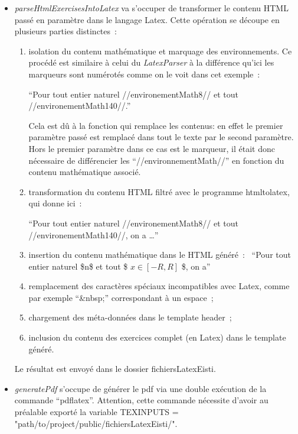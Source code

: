 \begin{itemize}
\item \textit{parseHtmlExercisesIntoLatex} va s'occuper de transformer le contenu HTML passé en paramètre dans le langage Latex. Cette opération se découpe en plusieurs parties distinctes~:

\begin{enumerate}
\item isolation du contenu mathématique et marquage des environnements. Ce procédé est similaire à celui du \textit{LatexParser} à la différence qu'ici les marqueurs sont numérotés comme on le voit dans cet exemple~:
\begin{center}
\enquote{Pour tout entier naturel //environementMath8// et tout //environementMath140//.}
\end{center}

Cela est dû à la fonction qui remplace les contenus: en effet le premier paramètre passé est remplacé dans tout le texte par le second paramètre. Hors le premier paramètre dans ce cas est le marqueur, il était donc nécessaire de différencier les \enquote{//environnementMath//} en fonction du contenu mathématique associé.

\item transformation du contenu HTML filtré avec le programme htmltolatex, qui donne ici~:~

\enquote{Pour tout entier naturel //environementMath8// et tout //environementMath140//, on a \ldots}
\item insertion du contenu mathématique dans le HTML généré~:~
\enquote{Pour tout entier naturel \$n\$ et tout \$ $ x \in [-R,R] $ \$, on a}
\item remplacement des caractères spéciaux incompatibles avec Latex, comme par exemple \enquote{\&nbsp;} correspondant à un espace~;
\item chargement des méta-données dans le template header~;
\item inclusion du contenu des exercices complet (en Latex) dans le template généré.
\end{enumerate}
Le résultat est envoyé dans le dossier fichiersLatexEisti.
\smallskip

\item \textit{generatePdf} s'occupe de générer le pdf via une double exécution de la commande \enquote{pdflatex}. Attention, cette commande nécessite d'avoir au préalable exporté la variable TEXINPUTS = "path/to/project/public/fichiersLatexEisti/".
\end{itemize}

